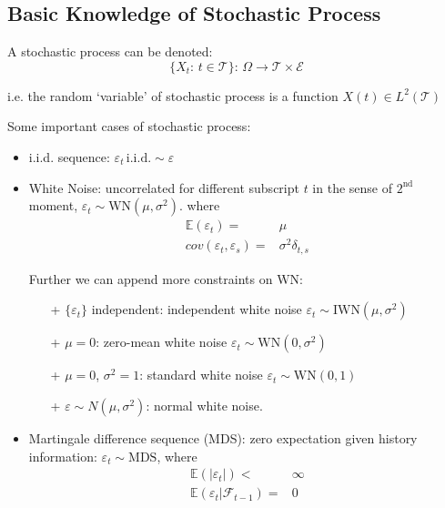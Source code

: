 \subsection{Basic Knowledge of Stochastic Process}
    A stochastic process can be denoted:
    \begin{equation}
        \{X_t:\,t\in \mathcal{T}\}:\, \Omega\to \mathcal{T}\times \mathcal{E}
    \end{equation}

    i.e. the random `variable' of stochastic process is a function $ X(t)\in L^2(\mathcal{T}) $
    
\begin{point}
    Some important cases of stochastic process:
\end{point}

    
    \begin{itemize}[topsep=2pt,itemsep=0pt]
        \item i.i.d. sequence: $ \varepsilon _t\,\mathrm{i.i.d.}\sim \varepsilon   $        
        \item White Noise: uncorrelated for different subscript $ t $ in the sense of $ 2^\mathrm{nd}  $ moment, $ \varepsilon _t\sim \mathrm{WN}(\mu ,\sigma ^2)  $. where
        \begin{align}
            \mathbb{E}\left( \varepsilon _t \right) =&\mu \\
            cov(\varepsilon _t,\varepsilon _s)=&\sigma ^2\delta _{t,s}
        \end{align}

        Further we can append more constraints on $ \mathrm{WN}  $:
        \begin{itemize}[topsep=2pt,itemsep=0pt]
            \item[+] $ \{\varepsilon _t\} $ independent: independent white noise $ \varepsilon _t\sim \mathrm{IWN}(\mu ,\sigma ^2)  $ 
            \item[+] $ \mu =0 $: zero-mean white noise $ \varepsilon _t\sim \mathrm{WN}(0 ,\sigma ^2)  $
            \item[+] $ \mu =0 $, $ \sigma ^2=1 $: standard white noise $ \varepsilon _t\sim \mathrm{WN}(0,1)  $
            \item[+] $ \varepsilon \sim N(\mu ,\sigma ^2) $: normal white noise.
        \end{itemize}
        \item Martingale difference sequence (MDS): zero expectation given history information: $ \varepsilon _t\sim \mathrm{MDS}  $, where
        \begin{align}
            \mathbb{E}\left( |\varepsilon _t| \right) <&\infty\\
            \mathbb{E}\left( \varepsilon _t|\mathcal{F}_{t-1} \right) =&0
        \end{align}


\end{itemize}
